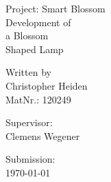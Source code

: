 \documentclass[00_doc.tex]{subfiles}
\begin{document}
    \begin{titlepage}
        \noindent
        Project: Smart Blossom
        \vspace{2em}
        \\
        {\fontsize{40}{50}\selectfont
        Development of \\[0.5em]
        a Blossom \\[0.5em]
        Shaped Lamp \\[0.5em]
        }
        \vspace*{\fill}
        \small 

        \hspace*{\fill} Written by \\
        \hspace*{\fill} Christopher Heiden \\
        \hspace*{\fill} MatNr.: 120249 \\
        \vspace{2em}

        \hspace*{\fill} Supervisor:  \\
        \hspace*{\fill} Clemens Wegener \\
        \vspace{2em}

        \hspace*{\fill} Submission: \\
        \hspace*{\fill} \bkdate\today 
    \end{titlepage}
    \newpage

    \tableofcontents
    \newpage
\end{document}
